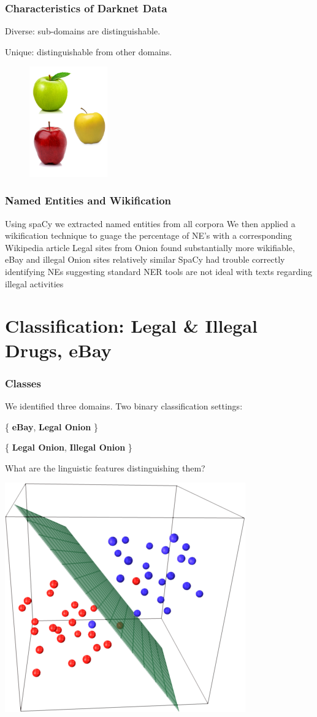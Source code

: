 \documentclass[t,xcolor={svgnames,table}]{beamer}
\begin{document}
\begin{frame}
	\frametitle{Characteristics of Darknet Data}
	
	Diverse: sub-domains are distinguishable.
	\vfill
	
	Unique: distinguishable from other domains.
	
	\begin{figure}
		\centering
		\includegraphics[width=0.3\textwidth]{3different.png}
	\end{figure}
\end{frame}

\begin{frame}
	\frametitle{Named Entities and Wikification}
	Using spaCy we extracted named entities from all corpora
	We then applied a wikification technique to guage the percentage of NE's with a corresponding Wikipedia article
	Legal sites from Onion found substantially more wikifiable, eBay and illegal Onion sites relatively similar
	SpaCy had trouble correctly identifying NEs suggesting standard NER tools are not ideal with texts regarding illegal activities
\end{frame}

\section{Classification: Legal \& Illegal Drugs, eBay}

\begin{frame}
	\frametitle{Classes}
	We identified three domains. Two binary classification settings:
	\begin{center}
	\{ \textbf{\color{yellow} eBay}, \textbf{\color{green} Legal Onion} \}
	\vfill
	
	\{ \textbf{\color{green} Legal Onion}, \textbf{\color{red} Illegal Onion} \}
	\end{center}
	\vfill
	\pause
	
	What are the linguistic features distinguishing them?
	\vfill
	
	\begin{center}
	\includegraphics[width=.3\textwidth]{svm.png}
	\end{center}
\end{frame}
\end{document}
